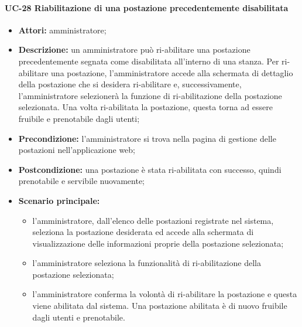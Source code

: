 \paragraph{UC-28 Riabilitazione di una postazione precedentemente disabilitata}
\begin{itemize}
    \item \textbf{Attori:} amministratore;
    \item \textbf{Descrizione:} un amministratore pu\`{o} ri-abilitare una postazione precedentemente segnata come disabilitata all'interno di una stanza. Per ri-abilitare una postazione, l'amministratore accede alla schermata di dettaglio della postazione che si desidera ri-abilitare e, successivamente, l'amministratore selezionerà la funzione di ri-abilitazione della postazione selezionata. Una volta ri-abilitata la postazione, questa torna ad essere fruibile e prenotabile dagli utenti;
    \item \textbf{Precondizione:} l'amministratore si trova nella pagina di gestione delle postazioni nell'applicazione web;
    \item \textbf{Postcondizione:} una postazione \`{e} stata ri-abilitata con successo, quindi prenotabile e servibile nuovamente;
    \item \textbf{Scenario principale:}
    \begin{itemize}
        \item l'amministratore, dall'elenco delle postazioni registrate nel sistema, seleziona la postazione desiderata ed accede alla schermata di visualizzazione delle informazioni proprie della postazione selezionata;
        \item l'amministratore seleziona la funzionalità di ri-abilitazione della postazione selezionata;
        \item l'amministratore conferma la volontà di ri-abilitare la postazione e questa viene abilitata dal sistema. Una postazione abilitata è di nuovo fruibile dagli utenti e prenotabile.
    \end{itemize}
\end{itemize}
